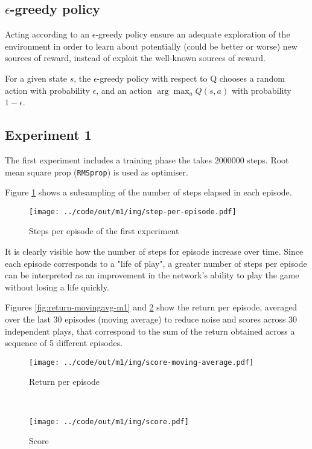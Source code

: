 \documentclass[a4paper,12pt]{article} %
\begin{document}
	\subsection{$\epsilon$-greedy policy}
	
	Acting according to an $\epsilon$-greedy policy ensure an adequate exploration of the environment in order to learn about potentially (could be better or worse) new sources of reward, instead of exploit the well-known sources of reward.
	
	For a given state $s$, the $\epsilon$-greedy policy with respect to Q chooses a random action with probability $\epsilon$, and an action $\arg \max_a Q(s, a)$ with probability $1 - \epsilon$.
	
	\subsection{Experiment 1}
	The first experiment includes a training phase the takes $2000000$ steps. 
	Root mean square prop (\texttt{RMSprop}) is used as optimiser.
	
	Figure \ref{fig:step-m1} shows a subsampling of the number of steps elapsed in each episode.
	
	\begin{figure}[htb]
		\centering
		\texttt{[image: ../code/out/m1/img/step-per-episode.pdf]}	
		\caption{Steps per episode of the first experiment}
		\label{fig:step-m1}
	\end{figure}

	It is clearly visible how the number of steps for episode increase over time. Since each episode corresponds to a "life of play", a greater number of steps per episode can be interpreted as an improvement in the network's ability to play the game without losing a life quickly. 
	\bigskip
	
	Figures \ref{fig:return-movingavg-m1} and \ref{fig:score-m1} show the return per episode, averaged over the last 30 episodes (moving average) to reduce noise and scores across 30 independent plays, that correspond to the sum of the return obtained across a sequence of 5 different episodes.
	
	\begin{figure}[htb]
		\begin{minipage}[b]{.49\textwidth}
			\centering
			\texttt{[image: ../code/out/m1/img/score-moving-average.pdf]}	
			\caption{Return per episode}
			\label{fig:return-movingavg-m1}
		\end{minipage}
		~
		\begin{minipage}[b]{.49\textwidth}
			\centering
			\texttt{[image: ../code/out/m1/img/score.pdf]}	
			\caption{Score}
			\label{fig:score-m1}
		\end{minipage}
	\end{figure}
\end{document}
